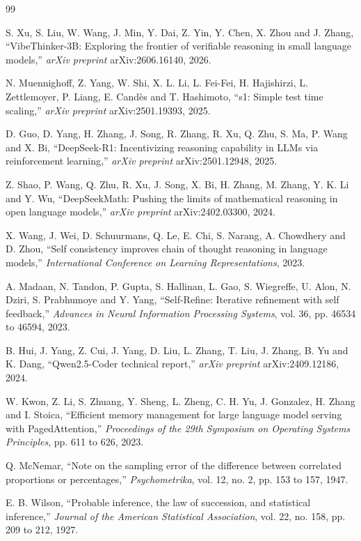 \documentclass[12pt,a4paper,oneside]{report}
\begin{document}
\begin{thebibliography}{99}

S. Xu, S. Liu, W. Wang, J. Min, Y. Dai, Z. Yin, Y. Chen, X. Zhou and J. Zhang,
``VibeThinker-3B: Exploring the frontier of verifiable reasoning in small language
models,'' \emph{arXiv preprint} arXiv:2606.16140, 2026.

N. Muennighoff, Z. Yang, W. Shi, X. L. Li, L. Fei-Fei, H. Hajishirzi,
L. Zettlemoyer, P. Liang, E. Cand\`{e}s and T. Hashimoto, ``s1: Simple test time
scaling,'' \emph{arXiv preprint} arXiv:2501.19393, 2025.

D. Guo, D. Yang, H. Zhang, J. Song, R. Zhang, R. Xu, Q. Zhu, S. Ma, P. Wang and
X. Bi, ``DeepSeek-R1: Incentivizing reasoning capability in LLMs via reinforcement
learning,'' \emph{arXiv preprint} arXiv:2501.12948, 2025.

Z. Shao, P. Wang, Q. Zhu, R. Xu, J. Song, X. Bi, H. Zhang, M. Zhang, Y. K. Li and
Y. Wu, ``DeepSeekMath: Pushing the limits of mathematical reasoning in open language
models,'' \emph{arXiv preprint} arXiv:2402.03300, 2024.

X. Wang, J. Wei, D. Schuurmans, Q. Le, E. Chi, S. Narang, A. Chowdhery and D. Zhou,
``Self consistency improves chain of thought reasoning in language models,''
\emph{International Conference on Learning Representations}, 2023.

A. Madaan, N. Tandon, P. Gupta, S. Hallinan, L. Gao, S. Wiegreffe, U. Alon,
N. Dziri, S. Prabhumoye and Y. Yang, ``Self-Refine: Iterative refinement with self
feedback,'' \emph{Advances in Neural Information Processing Systems}, vol. 36,
pp. 46534 to 46594, 2023.

B. Hui, J. Yang, Z. Cui, J. Yang, D. Liu, L. Zhang, T. Liu, J. Zhang, B. Yu and
K. Dang, ``Qwen2.5-Coder technical report,'' \emph{arXiv preprint} arXiv:2409.12186,
2024.

W. Kwon, Z. Li, S. Zhuang, Y. Sheng, L. Zheng, C. H. Yu, J. Gonzalez, H. Zhang and
I. Stoica, ``Efficient memory management for large language model serving with
PagedAttention,'' \emph{Proceedings of the 29th Symposium on Operating Systems
Principles}, pp. 611 to 626, 2023.

Q. McNemar, ``Note on the sampling error of the difference between correlated
proportions or percentages,'' \emph{Psychometrika}, vol. 12, no. 2, pp. 153 to 157,
1947.

E. B. Wilson, ``Probable inference, the law of succession, and statistical
inference,'' \emph{Journal of the American Statistical Association}, vol. 22,
no. 158, pp. 209 to 212, 1927.

\end{thebibliography}
\end{document}
